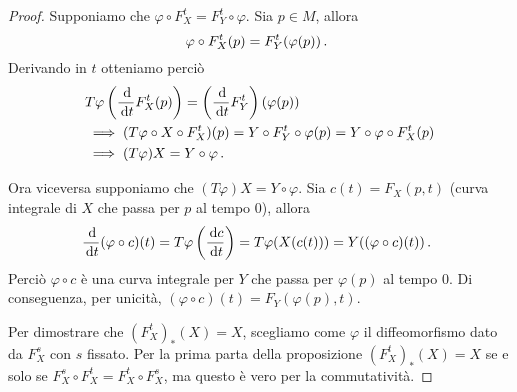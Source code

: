 \begin{proof}
	Supponiamo che $\varphi\circ F_X^t=F_Y^t\circ \varphi$. Sia $p\in M$, allora
	\begin{equation*}
		\varphi\circ F_X^t(p)=F_Y^t(\varphi(p))\, \text{. }
	\end{equation*}
	Derivando in $t$ otteniamo perciò
	\begin{align*}
		&T\varphi\left(\frac{\,\mathrm d}{\,\mathrm d t}F_X^t(p)\right)=\left(\frac{\,\mathrm d}{\,\mathrm d t}F_Y^t\right)(\varphi(p))\\
		&\implies (T\varphi\circ X\circ F_X^t)(p) = Y \circ F_Y^t \circ \varphi(p) = Y\circ \varphi \circ F_X^t(p) \\
		&\implies (T\varphi) X=Y\circ \varphi\, \text{. }
	\end{align*}
	
	Ora viceversa supponiamo che $(T\varphi)X=Y\circ\varphi$. Sia $c(t)=F_X(p,t)$ (curva integrale di $X$ che passa per $p$ al tempo 0), allora
	\begin{equation*}
		\frac {\,\mathrm d}{\,\mathrm d t}(\varphi\circ c)(t) = T\varphi \left(\frac{\,\mathrm d c}{\,\mathrm d t}\right) = T\varphi(X(c(t))) = Y((\varphi\circ c)(t))\, \text{. }
	\end{equation*}
	Perciò $\varphi\circ c$ è una curva integrale per $Y$ che passa per $\varphi(p)$ al tempo 0. Di conseguenza, per unicità, $(\varphi \circ c)(t) = F_Y(\varphi(p),t)$.
	
	Per dimostrare che $(F_X^t)_*(X)=X$, scegliamo come $\varphi$ il diffeomorfismo dato da $F_X^s$ con $s$ fissato. Per la prima parta della proposizione $(F_X^t)_*(X)=X$ se e solo se $F_X^s\circ F_X^t=F_X^t\circ F_X^s$, ma questo è vero per la commutatività.
\end{proof}